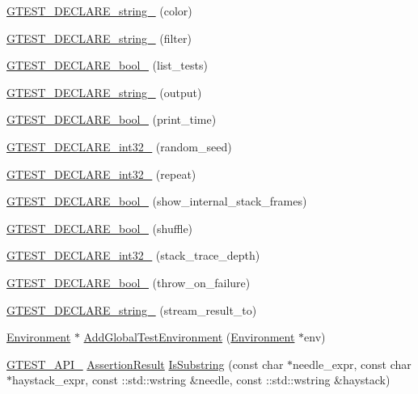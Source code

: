 \begin{DoxyCompactItemize}
\item 
\hyperlink{namespacetesting_a0f658c915a1e60996a2ab00a06612723}{G\-T\-E\-S\-T\-\_\-\-D\-E\-C\-L\-A\-R\-E\-\_\-string\-\_\-} (color)
\item 
\hyperlink{namespacetesting_a20d69860ce843142c7f740262e6b0c9a}{G\-T\-E\-S\-T\-\_\-\-D\-E\-C\-L\-A\-R\-E\-\_\-string\-\_\-} (filter)
\item 
\hyperlink{namespacetesting_af2cd3595c571ca408afc337bc4bb2619}{G\-T\-E\-S\-T\-\_\-\-D\-E\-C\-L\-A\-R\-E\-\_\-bool\-\_\-} (list\-\_\-tests)
\item 
\hyperlink{namespacetesting_a3fe54dd551f1c36cfdd1b36cd6881a44}{G\-T\-E\-S\-T\-\_\-\-D\-E\-C\-L\-A\-R\-E\-\_\-string\-\_\-} (output)
\item 
\hyperlink{namespacetesting_aeccefd463a0942da24750e1bbee76041}{G\-T\-E\-S\-T\-\_\-\-D\-E\-C\-L\-A\-R\-E\-\_\-bool\-\_\-} (print\-\_\-time)
\item 
\hyperlink{namespacetesting_ae754999b59509808254d39e3a3cf38e0}{G\-T\-E\-S\-T\-\_\-\-D\-E\-C\-L\-A\-R\-E\-\_\-int32\-\_\-} (random\-\_\-seed)
\item 
\hyperlink{namespacetesting_a315ef0647e4f2795bf1705de8e9c9659}{G\-T\-E\-S\-T\-\_\-\-D\-E\-C\-L\-A\-R\-E\-\_\-int32\-\_\-} (repeat)
\item 
\hyperlink{namespacetesting_af37b9206b938bb8b7d398a1379eb7482}{G\-T\-E\-S\-T\-\_\-\-D\-E\-C\-L\-A\-R\-E\-\_\-bool\-\_\-} (show\-\_\-internal\-\_\-stack\-\_\-frames)
\item 
\hyperlink{namespacetesting_a6d87f7374e105483905a305328856f4b}{G\-T\-E\-S\-T\-\_\-\-D\-E\-C\-L\-A\-R\-E\-\_\-bool\-\_\-} (shuffle)
\item 
\hyperlink{namespacetesting_adba6f8afa0f8695956d0134f1629a10b}{G\-T\-E\-S\-T\-\_\-\-D\-E\-C\-L\-A\-R\-E\-\_\-int32\-\_\-} (stack\-\_\-trace\-\_\-depth)
\item 
\hyperlink{namespacetesting_ac69f2aeeb84dc5f49bd3d040a6f32d17}{G\-T\-E\-S\-T\-\_\-\-D\-E\-C\-L\-A\-R\-E\-\_\-bool\-\_\-} (throw\-\_\-on\-\_\-failure)
\item 
\hyperlink{namespacetesting_ad4d1ea63037fc21018dbe997cb0041d1}{G\-T\-E\-S\-T\-\_\-\-D\-E\-C\-L\-A\-R\-E\-\_\-string\-\_\-} (stream\-\_\-result\-\_\-to)
\item 
\hyperlink{classtesting_1_1_environment}{Environment} $\ast$ \hyperlink{namespacetesting_a224caeebdb6586b728d204367fea1087}{Add\-Global\-Test\-Environment} (\hyperlink{classtesting_1_1_environment}{Environment} $\ast$env)
\item 
\hyperlink{gtest-port_8h_aa73be6f0ba4a7456180a94904ce17790}{G\-T\-E\-S\-T\-\_\-\-A\-P\-I\-\_\-} \hyperlink{classtesting_1_1_assertion_result}{Assertion\-Result} \hyperlink{namespacetesting_a2ff5c4d0c112d92b20232bd0cf173904}{Is\-Substring} (const char $\ast$needle\-\_\-expr, const char $\ast$haystack\-\_\-expr, const \-::std\-::wstring \&needle, const \-::std\-::wstring \&haystack)

\end{DoxyCompactItemize}
